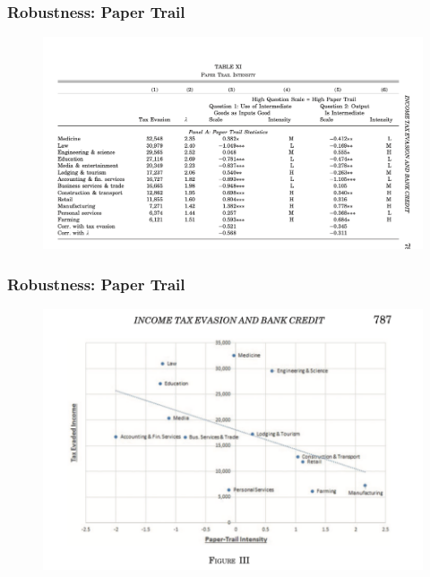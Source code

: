 \documentclass{beamer}
\begin{document}
\begin{frame}
\frametitle{Robustness: Paper Trail}
    \begin{figure}
        \centering
\includegraphics[width=\textwidth,height=\textheight,keepaspectratio]{Paper Presentations/T9.png}
    \end{figure}
\end{frame}

\begin{frame}
\frametitle{Robustness: Paper Trail}
    \begin{figure}
        \centering
\includegraphics[width=\textwidth,height=\textheight,keepaspectratio]{Paper Presentations/F2.png}
    \end{figure}
\end{frame}
\end{document}
